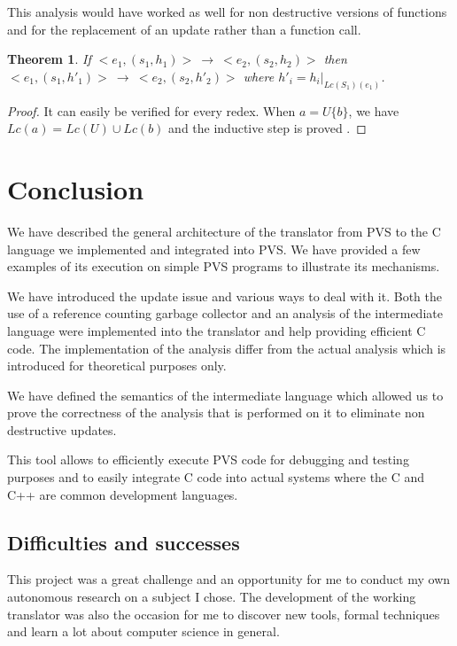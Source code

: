 \documentclass[12pt,a4paper]{article}
\newtheorem{theorem}{Theorem}
\newcommand{\ucont}[1]{\{#1\}}
\begin{document}
This analysis would have worked as well for non destructive versions of functions and for the replacement of an update rather than a function call.



\begin{theorem}
If $<e_1, (s_1, h_1)> \ \longrightarrow \ <e_2, (s_2, h_2)>$ then $<e_1, (s_1, h'_1)> \ \longrightarrow \ <e_2, (s_2, h'_2)>$ where $h'_i = h_i|_{Lc(S_1)(e_1)}$.
\end{theorem}
\begin{proof}
It can easily be verified for every redex. When $a = U\ucont{b}$, we have $Lc(a) = Lc(U) \cup Lc(b)$ and the inductive step is proved .
\end{proof}








\newpage
\section{Conclusion}
\label{sec:Concl}

We have described the general architecture of the translator from PVS to the C language we implemented and integrated into PVS. We have provided a few examples of its execution on simple PVS programs to illustrate its mechanisms.

We have introduced the update issue and various ways to deal with it. Both the use of a reference counting garbage collector and an analysis of the intermediate language were implemented into the translator and help providing efficient C code. The implementation of the analysis differ from the actual analysis which is introduced for theoretical purposes only.

We have defined the semantics of the intermediate language which allowed us to prove the correctness of the analysis that is performed on it to eliminate non destructive updates.

This tool allows to efficiently execute PVS code for debugging and testing purposes and to easily integrate C code into actual systems where the C and C++ are common development languages.



\subsection{Difficulties and successes}

This project was a great challenge and an opportunity for me to conduct my own autonomous research on a subject I chose. The development of the working translator was also the occasion for me to discover new tools, formal techniques and learn a lot about computer science in general.
\end{document}

